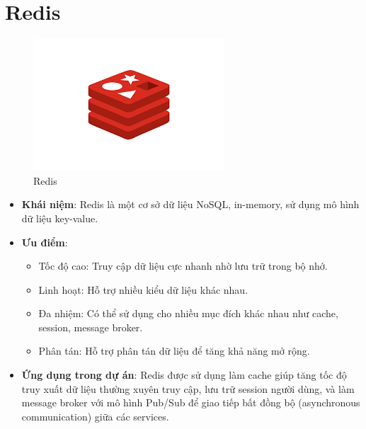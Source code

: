 \documentclass[../index.tex]{subfiles}
\begin{document}
    \section{Redis}
    \begin{figure}[H]
        \centering
        \includegraphics[width=0.3\linewidth]{figures/tech-logo/redis.png}
        \caption{Redis}
    \end{figure}
    \begin{itemize}
        \item \textbf{Khái niệm}: Redis là một cơ sở dữ liệu NoSQL, in-memory, sử
            dụng mô hình dữ liệu key-value.

        \item \textbf{Ưu điểm}:
            \begin{itemize}
                \item Tốc độ cao: Truy cập dữ liệu cực nhanh nhờ lưu trữ trong
                    bộ nhớ.

                \item Linh hoạt: Hỗ trợ nhiều kiểu dữ liệu khác nhau.

                \item Đa nhiệm: Có thể sử dụng cho nhiều mục đích khác nhau như
                    cache, session, message broker.

                \item Phân tán: Hỗ trợ phân tán dữ liệu để tăng khả năng mở rộng.
            \end{itemize}

        \item \textbf{Ứng dụng trong dự án}: Redis được sử dụng làm cache giúp tăng
            tốc độ truy xuất dữ liệu thường xuyên truy cập, lưu trữ session
            người dùng, và làm message broker với mô hình Pub/Sub để giao tiếp bất
            đồng bộ (asynchronous communication) giữa các services.
    \end{itemize}

\end{document}
